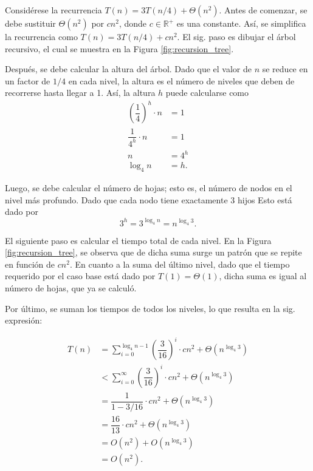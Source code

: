\begin{expl}
  Considérese la recurrencia \(T(n)=3T(n/4)+\Theta(n^2)\). 
  Antes de comenzar, se debe sustituir \(\Theta(n^2)\) por \(cn^2\), donde \(c\in\mathbb{R}^+\) es una constante. 
  Así, se simplifica la recurrencia como \(T(n)=3T(n/4)+cn^2\). 
  El sig. paso es dibujar el árbol recursivo, el cual se muestra en la Figura \ref{fig:recursion_tree}.
  
  Después, se debe calcular la altura del árbol. 
  Dado que el valor de \(n\) se reduce en un factor de \(1/4\) en cada nivel, la altura es el número de niveles que deben de recorrerse hasta llegar a 1. Así, la altura \(h\) puede calcularse como
  \[
    \begin{aligned}
      \left(\dfrac{1}{4}\right)^h\cdot n &= 1 \\
      \dfrac{1}{4^h}\cdot n &= 1 \\
      n &= 4^h \\
      \log_4{n} &= h.
    \end{aligned}
  \]
  
  Luego, se debe calcular el número de hojas; esto es, el número de nodos en el nivel más profundo.
  Dado que cada nodo tiene exactamente 3 hijos Esto está dado por
  \[
    3^h = 3^{\log_4{n}} = n^{\log_4{3}}.
  \]
  
  El siguiente paso es calcular el tiempo total de cada nivel.
  En la Figura \ref{fig:recursion_tree}, se observa que de dicha suma surge un patrón que se repite en función de \(cn^2\).
  En cuanto a la suma del último nivel, dado que el tiempo requerido por el caso base está dado por \(T(1)=\Theta(1)\), dicha suma es igual al número de hojas, que ya se calculó.
  
  Por último, se suman los tiempos de todos los niveles, lo que resulta en la sig. expresión:
  
  \begin{align*}
    T(n)&=\sum_{i=0}^{\log_{4}n-1}\left(\dfrac{3}{16}\right)^{i}\cdot cn^{2}+\Theta(n^{\log_{4}3}) \\
    &<\sum_{i=0}^{\infty}\left(\dfrac{3}{16}\right)^{i}\cdot cn^{2}+\Theta(n^{\log_{4}3}) \\
    &=\dfrac{1}{1-3/16}\cdot cn^{2}+\Theta(n^{\log_{4}3}) \\
    &=\dfrac{16}{13}\cdot cn^{2}+\Theta(n^{\log_{4}3}) \\
    &=O(n^{2})+O(n^{\log_{4}3}) \\
    &=O(n^{2}).
  \end{align*}
	\exend
\end{expl}

